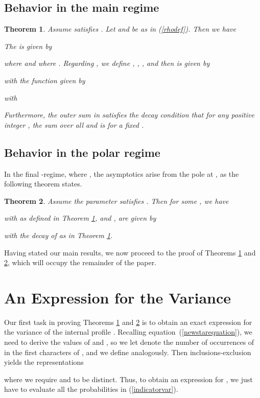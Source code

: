 \documentclass[proceedings]{aofa}
\newtheorem{theorem}{Theorem}
\begin{document}
\subsection{Behavior in the main regime}
\begin{theorem}\label{saddlepointtheorem}
Assume  satisfies . Let  and  be as in (\ref{rhodef}). Then we have

The  is given by

where  and where .
Regarding , we define
, , ,
and then  is given by

with the function  given by

with

Furthermore, the outer sum in  satisfies the decay condition that for any positive integer , the sum over all  and  is  for a fixed .

\end{theorem}

\subsection{Behavior in the polar regime}
In the final -regime, where , the
asymptotics arise from the pole at , as the following theorem states.
\begin{theorem}\label{poletheorem}
Assume the parameter  satisfies . Then for some , we have

with  as defined in Theorem
\ref{saddlepointtheorem}, and ,  are given by

with the decay of  as in Theorem \ref{saddlepointtheorem}.
\end{theorem}

Having stated our main results, we now proceed to the proof of Theorems \ref{saddlepointtheorem} and \ref{poletheorem}, which will occupy the remainder of the paper.

\section{An Expression for the Variance}\label{sec:combo} 
Our first task in proving  Theorems \ref{saddlepointtheorem} and
\ref{poletheorem} is  to obtain an exact expression for the variance
of the internal profile .
Recalling equation~(\ref{newstarequation}),
we need to derive the values of  and , so we let
 denote the number of occurrences of  in the first 
characters of ,
and we define  analogously. Then inclusions-exclusion yields the representations

where we require  and  to be distinct. Thus, to obtain an expression for , we just have to evaluate all the probabilities in (\ref{indicatorvar}).
\end{document}
